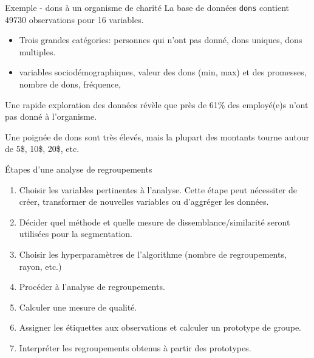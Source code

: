 \documentclass[
  ignorenonframetext,
]{beamer}
\providecommand{\tightlist}{%
  \setlength{\itemsep}{0pt}\setlength{\parskip}{0pt}}\usepackage{longtable,booktabs,array}
\begin{document}
\begin{frame}[fragile]{Exemple - dons à un organisme de charité}
\protect\hypertarget{exemple---dons-uxe0-un-organisme-de-charituxe9}{}
La base de données \texttt{dons} contient 49730 observations pour 16
variables.

\begin{itemize}
\tightlist
\item
  Trois grandes catégories: personnes qui n'ont pas donné, dons uniques,
  dons multiples.
\item
  variables sociodémographiques, valeur des dons (min, max) et des
  promesses, nombre de dons, fréquence,
\end{itemize}

Une rapide exploration des données révèle que près de 61\% des
employé(e)s n'ont pas donné à l'organisme.

Une poignée de dons sont très élevés, mais la plupart des montants
tourne autour de 5\$, 10\$, 20\$, etc.
\end{frame}

\begin{frame}{Étapes d'une analyse de regroupements}
\protect\hypertarget{uxe9tapes-dune-analyse-de-regroupements}{}
\begin{enumerate}
\tightlist
\item
  Choisir les variables pertinentes à l'analyse. Cette étape peut
  nécessiter de créer, transformer de nouvelles variables ou d'aggréger
  les données.
\item
  Décider quel méthode et quelle mesure de dissemblance/similarité
  seront utilisées pour la segmentation.
\item
  Choisir les hyperparamètres de l'algorithme (nombre de regroupements,
  rayon, etc.)
\item
  Procéder à l'analyse de regroupements.
\item
  Calculer une mesure de qualité.
\item
  Assigner les étiquettes aux observations et calculer un prototype de
  groupe.
\item
  Interpréter les regroupements obtenus à partir des prototypes.
\end{enumerate}
\end{frame}
\end{document}
